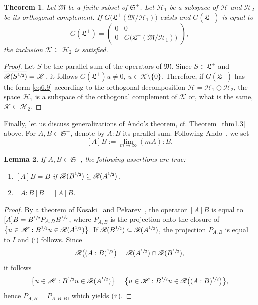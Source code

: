 \documentclass[12pt, a4paper, reqno, twoside]{amsart}
\numberwithin{equation}{section}
\newcommand{\frakS}{\mathfrak S}
\newcommand{\frakL}{\mathfrak L}
\newcommand{\frakM}{\mathfrak M}
\newcommand{\cf}{\mbox{cf.}\xspace}
\newtheorem{theorem}{Theorem}[section]
\newtheorem{lemma}[theorem]{Lemma}
\theoremstyle{definition}
\theoremstyle{remark}
\theoremstyle{mystyle}
\begin{document}
\begin{theorem}
\label{thm6.11}
Let $\frakM$ be a finite subset of $\frakS^{+}$. Let $\mathscr H_{1}$
be a subspace of $\mathscr H$ and $\mathscr H_{2}$ be its orthogonal
complement.  If\; $G\bigl(\frakL^{+}(\frakM/\mathscr H_{1})\bigr)$
exists and $G(\frakL^{+})$ is equal to
\begin{equation}
\label{eq6.9}
G(\frakL^{+}) =
   \begin{pmatrix} 0 & 0 \\
        0 & G\bigl(\frakL^{+}(\frakM/\mathscr H_{1})\bigr) 
   \end{pmatrix}, 
\end{equation}
the inclusion $\mathscr K\subseteq\mathscr H_{2}$ is satisfied.
\end{theorem}

\begin{proof}
Let $S$ be the parallel sum of the operators of $\frakM$. Since
$S\in\frakL^{+}$ and
$\overline{\mathscr R(S^{\sfrac{1}{2}})}=\mathscr K$, it
follows $G(\frakL^{+})u\neq0$, $u\in \mathscr
K\setminus\{0\}$. Therefore, if  $G(\frakL^{+})$ has the form
\eqref{eq6.9} according to the orthogonal decomposition $\mathscr
H=\mathscr H_{1}\oplus\mathscr H_{2}$, the space $\mathscr H_{1}$ is a      
subspace of the orthogonal complement of $\mathscr K$ or, what is the      
same, $\mathscr K\subseteq\mathscr H_{2}$.
\end{proof}

Finally, let us discuss generalizations of Ando's theorem, \cf
Theorem~\ref{thm1.3} above. For $A,B\in\frakS^{+}$, denote by $A:B$
its  parallel sum. Following Ando~\cite{Ando1999}, we set
\[
  [A]B:=\lim_{m\to\infty}(mA):B.
\]  

\begin{lemma}
\label{lem6.12}  
If $A,B\in\frakS^{+}$, the following assertions are true:
\begin{enumerate}
\item[(i)]
  $[A]B=B$ if\: 
  $\mathscr R(B^{\sfrac{1}{2}})\subseteq\mathscr R(A^{\sfrac{1}{2}})$,
\item[(ii)]
  $[A:B]B=[A]B$.
\end{enumerate}
\end{lemma}

\begin{proof}
By a theorem of Kosaki~\cite{Kosaki1984} and
Pekarev~\cite{Pekarev1978}, the operator $[A]B$ is equal to
$[A]B=B^{\sfrac{1}{2}}P_{A,B}B^{\sfrac{1}{2}}$, where $P_{A,B}$ is
the projection onto the closure of $\bigl\{u\in\mathscr
H:B^{\sfrac{1}{2}}u\in\mathscr R(A^{\sfrac{1}{2}})\bigr\}$. If
$\mathscr R(B^{\sfrac{1}{2}})\subseteq\mathscr
R(A^{\sfrac{1}{2}})$, the projection $P_{A,B}$ is equal to $I$
and (i) follows. Since
\[
  \mathscr R\bigl((A:B)^{\sfrac{1}{2}}\bigr)=
  \mathscr R(A^{\sfrac{1}{2}})\cap\mathscr R(B^{\sfrac{1}{2}}),
\]
it follows
\[
\bigl\{u\in\mathscr H: B^{\sfrac{1}{2}}u\in
\mathscr R(A^{\sfrac{1}{2}})\bigr\} =
\bigl\{u\in\mathscr H: B^{\sfrac{1}{2}}u\in\mathscr R\bigl((A:B)^{\sfrac{1}{2}}\bigr)\bigr\},
\]  
hence $P_{A,B}=P_{A:B,B}$, which yields (ii).
\end{proof}
\end{document}

